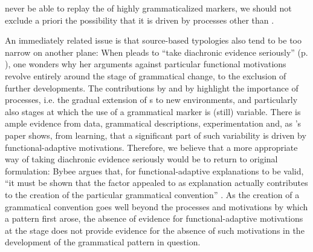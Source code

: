 \documentclass[output=paper]{langsci/langscibook}
\begin{document}
never be able to replay the  of highly grammaticalized markers, we should not exclude a priori the possibility that it is driven by processes other than . 

\largerpage
An immediately related issue is that source-based typologies also tend to be too narrow on another plane: When  pleads to “take diachronic evidence seriously” (p. \pageref{p:cristofaro:evidenceseriously}), one wonders why her arguments against particular functional motivations revolve entirely around the  stage of grammatical change, to the exclusion of further developments. The contributions by  and by  highlight the importance of  processes, i.e. the gradual extension of s to new environments, and particularly also stages at which the use of a grammatical marker is (still) variable. There is ample evidence from  data, grammatical descriptions,  experimentation and, as ’s paper shows, from  learning, that a significant part of such variability is driven by functional-adaptive motivations. Therefore, we believe that a more appropriate way of taking diachronic evidence seriously would be to return to  original formulation: Bybee argues that, for functional-adaptive explanations to be valid, “it must be shown that the factor appealed to as explanation actually contributes to the creation of the particular grammatical convention” \citep[357]{Bybee1988}. As the creation of a grammatical convention goes well beyond the processes and motivations by which a pattern first arose, the absence of evidence for functional-adaptive motivations at the  stage does not provide evidence for the absence of such motivations in the development of the grammatical pattern in question.
\newpage 
\largerpage
\end{document}
